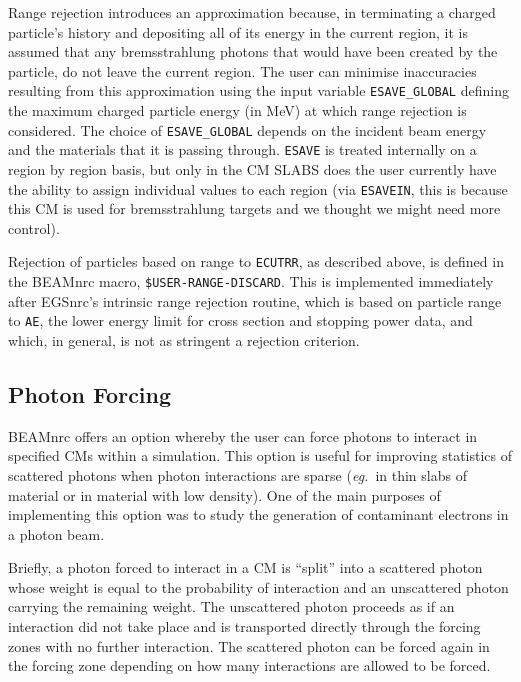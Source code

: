 \documentclass[12pt,twoside]{article}
\newcommand{\eg}{{\em eg.}}
\begin{document}
Range rejection introduces an approximation because, in
terminating a charged particle's history and depositing all of its
energy in the current region, it is assumed that any bremsstrahlung photons that
would have been created by the particle, do not leave the current
region.  The user can minimise inaccuracies resulting from this approximation
using the input variable
\verb+ESAVE_GLOBAL+ defining the maximum charged
particle energy (in
MeV) at which
range rejection is considered.  The choice of
\verb+ESAVE_GLOBAL+ depends on
the incident beam energy and the materials that it is passing through.
\verb+ESAVE+ is treated internally on a region by region basis, but only
in the CM SLABS does the user currently have the ability to assign
individual values to each region (via \verb+ESAVEIN+,
this is because this CM is used for
bremsstrahlung targets and we thought we might need more control).

Rejection of particles based on range to {\tt ECUTRR}, as described above, is
defined in the BEAMnrc macro, {\tt \$USER-RANGE-DISCARD}.  This is implemented
immediately after EGSnrc's intrinsic range rejection routine, which is based on
particle range to {\tt AE}, the lower energy limit for cross section and
stopping power data, and which, in general, is not as stringent a rejection
criterion.

\subsection{Photon Forcing}

BEAMnrc offers an option whereby the user can force photons to interact
in specified CMs within  a simulation.  This option is useful for improving
statistics of scattered photons when photon
interactions are sparse (\eg\ in thin
slabs of material or in material with low density).  One of the main
purposes of implementing this option was to study the generation of
contaminant electrons in a photon beam.

Briefly, a photon forced to interact in a CM is ``split'' into a
scattered photon whose weight is equal to the probability of interaction
and an unscattered photon carrying the remaining weight.  The unscattered
photon proceeds as if an interaction did not take place and is transported
directly through the forcing zones with no further interaction.
The scattered photon can be forced
again in the forcing zone depending on how many interactions are allowed
to be forced.
\end{document}

